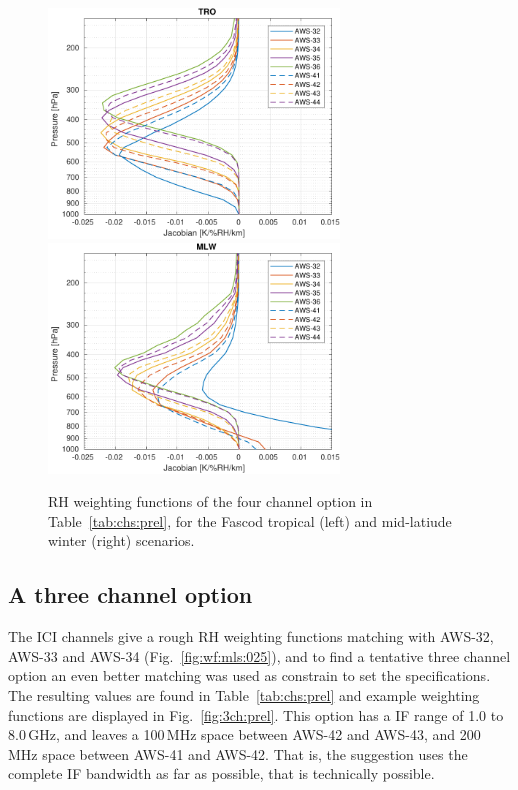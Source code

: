 \documentclass[12pt]{article}
\begin{document}
\begin{figure}[!p]
  \centering
  \includegraphics[height=61mm]{fascod_4chopt_tro}\hspace{5mm}%
  \includegraphics[clip,trim=43 0 0 0,height=61mm]{fascod_4chopt_mlw}
  \caption{RH weighting functions of the four channel option in
    Table~\ref{tab:chs:prel}, for the Fascod tropical (left) and mid-latiude
    winter (right) scenarios.}
  \label{fig:4ch:prel}
\end{figure}


\subsection{A three channel option}
%
The ICI channels give a rough RH weighting functions matching with AWS-32,
AWS-33 and AWS-34 (Fig.~\ref{fig:wf:mls:025}), and to find a tentative three
channel option an even better matching was used as constrain to set the
specifications. The resulting values are found in Table~\ref{tab:chs:prel} and
example weighting functions are displayed in Fig.~\ref {fig:3ch:prel}. This
option has a IF range of 1.0 to 8.0\,GHz, and leaves a 100\,MHz space between
AWS-42 and AWS-43, and 200\,MHz space between AWS-41 and AWS-42. That is, the
suggestion uses the complete IF bandwidth as far as possible, that is
technically possible.
\end{document}
